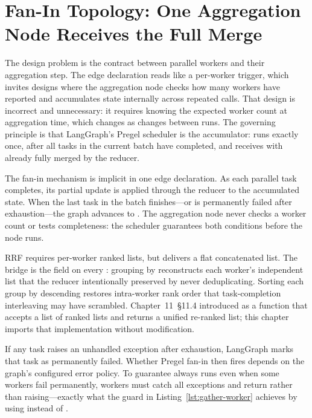 \section{Fan-In Topology: One Aggregation Node Receives the Full Merge}
\label{sec:map-reduce-topo}

The design problem is the contract between parallel workers and their
aggregation step. The edge declaration
 reads like a per-worker
trigger, which invites designs where the aggregation node checks how many
workers have reported and accumulates state internally across repeated
calls. That design is incorrect and unnecessary: it requires knowing the
expected worker count at aggregation time, which changes as
 changes between runs. The governing principle is that
LangGraph's Pregel scheduler is the accumulator: 
runs exactly once, after all tasks in the current  batch have
completed, and receives  with 
already fully merged by the  reducer.

The fan-in mechanism is implicit in one edge declaration. As each parallel
task completes, its  partial update is
applied through the  reducer to the accumulated state.
When the last task in the batch finishes---or is permanently failed after
 exhaustion---the graph advances to .
The aggregation node never checks a worker count or tests completeness:
the scheduler guarantees both conditions before the node runs.

RRF requires per-worker ranked lists, but  delivers a
flat concatenated list. The bridge is the  field on every
: grouping by  reconstructs each
worker's independent list that the reducer intentionally preserved by
never deduplicating. Sorting each group by  descending
restores intra-worker rank order that task-completion interleaving may
have scrambled. Chapter~11~\S11.4 introduced 
as a function that accepts a list of ranked lists and returns a unified
re-ranked list; this chapter imports that implementation without
modification.

\begin{warningbox}
If any  task raises an unhandled exception after
 exhaustion, LangGraph marks that task as permanently
failed. Whether Pregel fan-in then fires depends on the graph's configured
error policy. To guarantee  always runs even when
some workers fail permanently, workers must catch all exceptions and
return  rather than raising---exactly what
the  guard in
Listing~\ref{lst:gather-worker} achieves by using  instead
of .
\end{warningbox}

